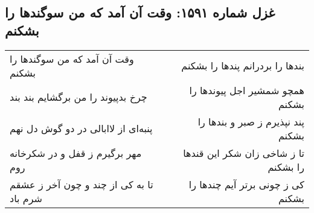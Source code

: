 \begin{center}
\section*{غزل شماره ۱۵۹۱: وقت آن آمد که من سوگندها را بشکنم}
\label{sec:1591}
\begin{longtable}{l p{0.5cm} r}
وقت آن آمد که من سوگندها را بشکنم
&&
بندها را بردرانم پندها را بشکنم
\\
چرخ بدپیوند را من برگشایم بند بند
&&
همچو شمشیر اجل پیوندها را بشکنم
\\
پنبه‌ای از لاابالی در دو گوش دل نهم
&&
پند نپذیرم ز صبر و بندها را بشکنم
\\
مهر برگیرم ز قفل و در شکرخانه روم
&&
تا ز شاخی زان شکر این قندها را بشکنم
\\
تا به کی از چند و چون آخر ز عشقم شرم باد
&&
کی ز چونی برتر آیم چندها را بشکنم
\\
\end{longtable}
\end{center}
